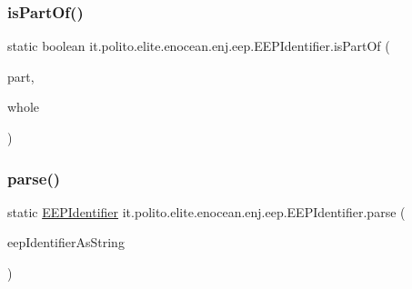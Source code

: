 \subsubsection{\texorpdfstring{is\+Part\+Of()}{isPartOf()}}
{\footnotesize\ttfamily static boolean it.\+polito.\+elite.\+enocean.\+enj.\+eep.\+E\+E\+P\+Identifier.\+is\+Part\+Of (\begin{DoxyParamCaption}\item[{\hyperlink{classit_1_1polito_1_1elite_1_1enocean_1_1enj_1_1eep_1_1_e_e_p_identifier}{E\+E\+P\+Identifier}}]{part,  }\item[{\hyperlink{classit_1_1polito_1_1elite_1_1enocean_1_1enj_1_1eep_1_1_e_e_p_identifier}{E\+E\+P\+Identifier}}]{whole }\end{DoxyParamCaption})\hspace{0.3cm}{\ttfamily [static]}}

\hypertarget{classit_1_1polito_1_1elite_1_1enocean_1_1enj_1_1eep_1_1_e_e_p_identifier_aa5eedbee35b69679a1a74d0838bf270d}{}\label{classit_1_1polito_1_1elite_1_1enocean_1_1enj_1_1eep_1_1_e_e_p_identifier_aa5eedbee35b69679a1a74d0838bf270d} 
\subsubsection{\texorpdfstring{parse()}{parse()}}
{\footnotesize\ttfamily static \hyperlink{classit_1_1polito_1_1elite_1_1enocean_1_1enj_1_1eep_1_1_e_e_p_identifier}{E\+E\+P\+Identifier} it.\+polito.\+elite.\+enocean.\+enj.\+eep.\+E\+E\+P\+Identifier.\+parse (\begin{DoxyParamCaption}\item[{String}]{eep\+Identifier\+As\+String }\end{DoxyParamCaption})\hspace{0.3cm}{\ttfamily [static]}}

\hypertarget{classit_1_1polito_1_1elite_1_1enocean_1_1enj_1_1eep_1_1_e_e_p_identifier_a2e0afd38aa1717e084ac8fb01758878b}{}\label{classit_1_1polito_1_1elite_1_1enocean_1_1enj_1_1eep_1_1_e_e_p_identifier_a2e0afd38aa1717e084ac8fb01758878b} 

